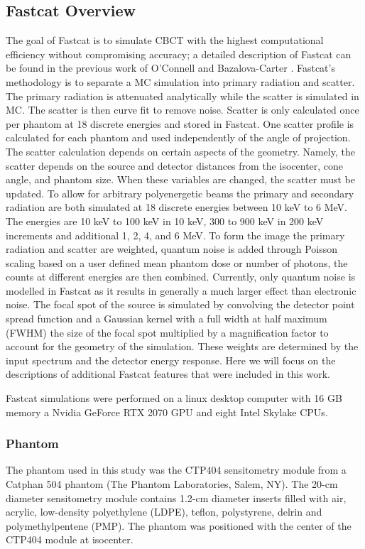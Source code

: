 \subsection{Fastcat Overview}

The goal of Fastcat is to simulate CBCT with the highest computational efficiency without compromising accuracy; a detailed description of Fastcat can be found in the previous work of O’Connell and Bazalova-Carter \cite{OConnell2021FastCAT:Simulation}. Fastcat’s methodology is to separate a MC simulation into primary radiation and scatter. The primary radiation is attenuated analytically while the scatter is simulated in MC. The scatter is then curve fit to remove noise. Scatter is only calculated once per phantom at 18 discrete energies and stored in Fastcat. One scatter profile is calculated for each phantom and used independently of the angle of projection. The scatter calculation depends on certain aspects of the geometry. Namely, the scatter depends on the source and detector distances from the isocenter, cone angle, and phantom size. When these variables are changed, the scatter must be updated. To allow for arbitrary polyenergetic beams the primary and secondary radiation are both simulated at 18 discrete energies between 10 keV to 6 MeV. The energies are 10 keV to 100 keV  in 10 keV, 300 to 900 keV in 200 keV increments and additional 1, 2, 4, and 6 MeV. To form the image the primary radiation and scatter are weighted, quantum noise is added through Poisson scaling based on a user defined mean phantom dose or number of photons, the counts at different energies are then combined. Currently, only quantum noise is modelled in Fastcat as it results in generally a much larger effect than electronic noise. The focal spot of the source is simulated by convolving the detector point spread function and a Gaussian kernel with a full width at half maximum (FWHM) the size of the focal spot multiplied by a magnification factor to account for the geometry of the simulation. These weights are determined by the input spectrum and the detector energy response. Here we will focus on the descriptions of additional Fastcat features that were included in this work.

Fastcat simulations were performed on a linux desktop computer with 16 GB memory a Nvidia GeForce RTX 2070 GPU and eight Intel Skylake CPUs.

\subsubsection{Phantom}
The phantom used in this study was the CTP404 sensitometry module from a Catphan 504 phantom (The Phantom Laboratories, Salem, NY). The 20-cm diameter sensitometry module contains 1.2-cm diameter inserts filled with air, acrylic, low-density polyethylene (LDPE), teflon, polystyrene, delrin and polymethylpentene (PMP). The phantom was positioned with the center of the CTP404 module at isocenter.

